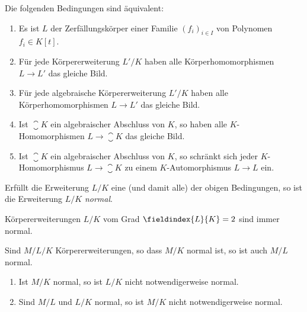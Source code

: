 \begin{proposition}
  Die folgenden Bedingungen sind äquivalent:
  \begin{enumerate}
    \item
      Es ist $L$ der Zerfällungskörper einer Familie $(f_i)_{i \in I}$ von Polynomen $f_i \in K[t]$.
    \item
      Für jede Körpererweiterung $L'/K$ haben alle Körperhomomorphismen $L \to L'$ das gleiche Bild.
    \item
      Für jede algebraische Körpererweiterung $L'/K$ haben alle Körperhomomorphismen $L \to L'$ das gleiche Bild.
    \item
      Ist $\closure{K}$ ein algebraischer Abschluss von $K$, so haben alle $K$-Homomorphismen $L \to \closure{K}$ das gleiche Bild.
    \item
      Ist $\closure{K}$ ein algebraischer Abschluss von $K$, so schränkt sich jeder $K$-Homomorphismus $L \to \closure{K}$ zu einem $K$-Automorphismus $L \to L$ ein.
  \end{enumerate}
\end{proposition}

\begin{definition}
  Erfüllt die Erweiterung $L/K$ eine \textup(und damit alle\textup) der obigen Bedingungen, so ist die Erweiterung $L/K$ \emph{normal}.
\end{definition}

\begin{example}
  Körpererweiterungen $L/K$ vom Grad $\fieldindex{L}{K} = 2$ sind immer normal.
\end{example}

\begin{lemma}
  Sind $M/L/K$ Körpererweiterungen, so dass $M/K$ normal ist, so ist auch $M/L$ normal.
\end{lemma}

\begin{warning}
  \begin{enumerate}
    \item
      Ist $M/K$ normal, so ist $L/K$ nicht notwendigerweise normal.
    \item
      Sind $M/L$ und $L/K$ normal, so ist $M/K$ nicht notwendigerweise normal.
  \end{enumerate}
\end{warning}










